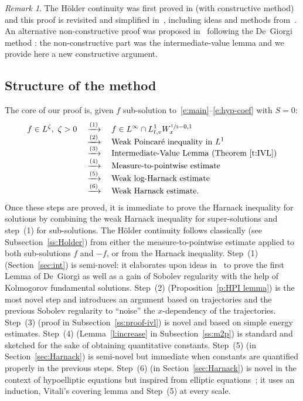 \documentclass[10pt]{amsart}
\theoremstyle{definition}
\theoremstyle{remark}
\newtheorem{remark}[theorem]{Remark}
\begin{document}
\begin{remark}
The Hölder continuity was first proved in \cite{wz09,wz11}
(with constructive method) and this proof is revisited and
simplified in~\cite{Guerand-Imbert}, including ideas and
methods from~\cite{moser,kru63,kru64}. An alternative
non-constructive proof was proposed in~\cite{gimv} following
the De~Giorgi method \cite{DG56}: the non-constructive part was
the intermediate-value lemma and we provide here a new
constructive argument.
\end{remark}

\subsection{Structure of the method}

The core of our proof is, given $f$ sub-solution
to~\eqref{e:main}--\eqref{e:hyp-coef} with $S=0$:\vspace*{-5pt}\enlargethispage{.5\baselineskip}%
\begin{align*}
f \in L^\zeta, \ \zeta >0
& \quad \xrightarrow{(1)}
\quad f \in L^\infty \cap L^1_{t,v}W^{\sfrac13-0,1}_x \\[-5pt]
& \quad \xrightarrow{(2)} \quad
\text{Weak Poincaré inequality in $L^1$} \\[-5pt]
& \quad \xrightarrow{(3)}
\quad \text{Intermediate-Value Lemma (Theorem~\ref{t:IVL}})\\[-5pt]
& \quad \xrightarrow{(4)}
\quad \text{Measure-to-pointwise estimate} \\[-5pt]
& \quad \xrightarrow{(5)} \quad \text{Weak log-Harnack
estimate} \\[-5pt]
& \quad \xrightarrow{(6)}
\quad \text{Weak Harnack estimate.}
\end{align*}
Once these steps are proved, it is immediate to prove the Harnack
inequality for solutions by combining the weak Harnack inequality
for super-solutions and step~(1) for sub-solutions. The Hölder
continuity follows classically (see Subsection~\ref{ss:Holder})
from either the measure-to-pointwise estimate applied to both
sub-solutions $f$ and $-f$, or from the Harnack inequality.
Step~(1) (Section~\ref{sec:int}) is semi-novel: it elaborates
upon ideas in~\cite{pp} to prove the first Lemma of De~Giorgi as
well as a gain of Sobolev regularity with the help of Kolmogorov
fundamental solutions. Step~(2) (Proposition~\ref{p:HPI lemma})
is the most novel step and introduces an argument based on
trajectories and the previous Sobolev regularity to ``noise'' the
$x$-dependency of the trajectories. Step~(3) (proof in
Subsection~\ref{ss:proof-ivl}) is novel and based on simple
energy estimates. Step~(4) (Lemma~\ref{l:increase} in
Subsection~\ref{ss:m2p}) is standard and sketched for the sake of
obtaining quantitative constants. Step~(5) (in
Section~\ref{sec:Harnack}) is semi-novel but immediate when
constants are quantified properly in the previous steps. Step~(6)
(in Section~\ref{sec:Harnack}) is novel in the context of
hypoelliptic equations but inspired from elliptic
equations~\cite{MR3565366}; it uses an induction, Vitali's
covering lemma and Step~(5) at every scale.
\end{document}
